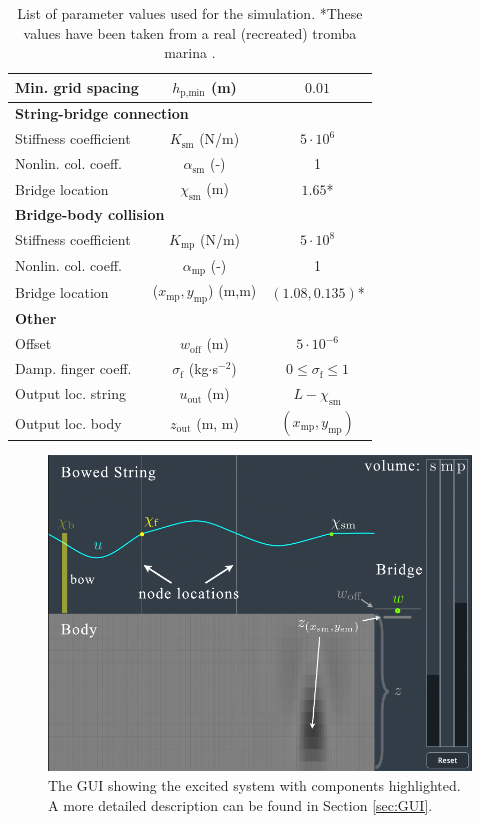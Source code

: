 \documentclass[dvipsnames, pdftex]{article}
\def\SBcomment[#1]{\textcolor{Red}{#1}}
\def\SWcomment[#1]{\textcolor{Bittersweet}{#1}}
\def\stringx{\chi}
\def\um{w}
\begin{document}
\begin{table}[t]
\begin{center}
\begin{tabular}{|l|c|c|}
    Min. grid spacing & $h_{\text{p},\text{min}}$ (m)& $0.01$\\ \hline
    \multicolumn{3}{|l|}{\bf String-bridge connection}\\\hline
    Stiffness coefficient & $K_\text{sm}$ (N/m) & $5\cdot10^{6}$\\
    Nonlin. col. coeff. &$\alpha_\text{sm}$ (-) & 1\\
    Bridge location & $\stringx_\text{sm}$ (m)& $1.65$*\\
    \hline
    \multicolumn{3}{|l|}{\bf Bridge-body collision}\\\hline
    Stiffness coefficient & $K_\text{mp}$ (N/m) & $5\cdot10^{8}$\\
    Nonlin. col. coeff. &$\alpha_\text{mp}$ (-) & 1\\
    Bridge location & ($x_\text{mp},y_\text{mp}$) (m,m)& $(1.08,0.135)$*\\\hline
    \multicolumn{3}{|l|}{\bf Other}\\\hline
    Offset & $\um_\text{off}$ (m) & $5\cdot 10^{-6}$\\
    Damp. finger coeff. &$\sigma_\text{f}$ (kg$\cdot$s$^{-2}$)&$0\leq \sigma_\text{f} \leq 1$\\
    Output loc. string & $u_\text{out}$ (m) & $L - \stringx_\text{sm}$\\
    Output loc. body & $z_\text{out}$ (m, m) & $(x_\text{mp},y_\text{mp})$\\
    \hline
\end{tabular}
\caption{List of parameter values used for the simulation. *These values have been taken from a real (recreated) tromba marina \cite{Baldwin2016:SMC2020}.}
\end{center}
\end{table}
\begin{figure}[t]
  \centering
  \includegraphics[width=1.0\columnwidth]{applicationDescription.pdf}
  \caption{The GUI showing the excited system with components highlighted. A more detailed description can be found in Section \ref{sec:GUI}. %
  }
  \label{fig:GUI}
\end{figure}
\end{document}

